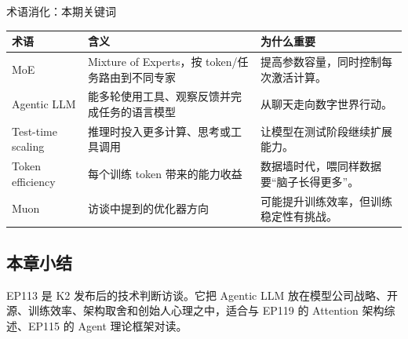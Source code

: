 \begin{knowledgebox}{术语消化：本期关键词}
\begin{tabularx}{\textwidth}{p{}p{}X}
\toprule
术语 & 含义 & 为什么重要 \\
\midrule
MoE & Mixture of Experts，按 token/任务路由到不同专家 & 提高参数容量，同时控制每次激活计算。 \\
Agentic LLM & 能多轮使用工具、观察反馈并完成任务的语言模型 & 从聊天走向数字世界行动。 \\
Test-time scaling & 推理时投入更多计算、思考或工具调用 & 让模型在测试阶段继续扩展能力。 \\
Token efficiency & 每个训练 token 带来的能力收益 & 数据墙时代，喂同样数据要“脑子长得更多”。 \\
Muon & 访谈中提到的优化器方向 & 可能提升训练效率，但训练稳定性有挑战。 \\
\bottomrule
\end{tabularx}
\end{knowledgebox}

\subsection{本章小结}

EP113 是 K2 发布后的技术判断访谈。它把 Agentic LLM 放在模型公司战略、开源、训练效率、架构取舍和创始人心理之中，适合与 EP119 的 Attention 架构综述、EP115 的 Agent 理论框架对读。

